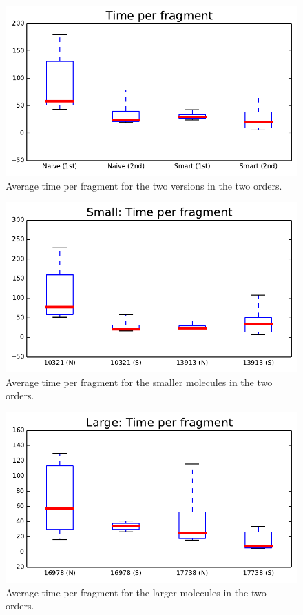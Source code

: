 \begin{figure}
\center
\includegraphics[width=.9\textwidth]{img/graphs/1a_03.pdf}
\caption{Average time per fragment for the two versions in the two orders.}
\end{figure}

\begin{figure}
\center
\includegraphics[width=.9\textwidth]{img/graphs/1b_03.pdf}
\caption{Average time per fragment for the smaller molecules in the two orders.}
\end{figure}

\begin{figure}
\center
\includegraphics[width=.9\textwidth]{img/graphs/1c_03.pdf}
\caption{Average time per fragment for the larger molecules in the two orders.}
\end{figure}


